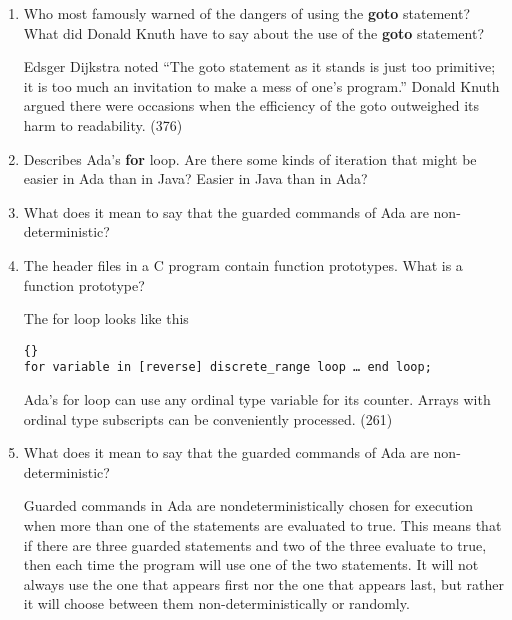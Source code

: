\begin{enumerate}
  \item Who most famously warned of the dangers of using the
    \textbf{goto} statement? What did Donald Knuth have to
    say about the use of the \textbf{goto} statement?

 \begin{answer}
    Edsger Dijkstra noted “The goto statement as it stands is just too
    primitive; it is too much an invitation to make a mess of one’s
    program.” Donald Knuth argued there were occasions when the
    efficiency of the goto outweighed its harm to readability. (376)
     \end{answer}

  \item Describes Ada's \textbf{for} loop. Are there some
    kinds of iteration that might be easier in Ada than
    in Java? Easier in Java than in Ada?

  \item What does it mean to say that the guarded commands
    of Ada are non-deterministic?

  \item The header files in a C program contain function
    prototypes. What is a function prototype?

 \begin{answer}
    The for loop looks like this

\begin{lstlisting}{}
for variable in [reverse] discrete_range loop … end loop; 
\end{lstlisting}

Ada’s for loop can use any ordinal type variable for its
counter. Arrays with ordinal type subscripts can be conveniently
processed. (261)
   \end{answer}
   
  \item What does it mean to say that the guarded commands
    of Ada are non-deterministic?

 \begin{answer}
    Guarded commands in Ada are nondeterministically chosen for
    execution when more than one of the statements are evaluated to
    true. This means that if there are three guarded statements and
    two of the three evaluate to true, then each time the program will
    use one of the two statements. It will not always use the one that
    appears first nor the one that appears last, but rather it will
    choose between them non-deterministically or randomly.
     \end{answer}


\end{enumerate}

